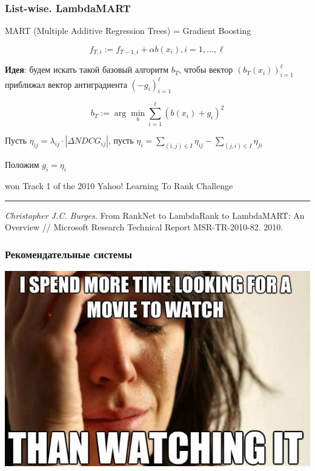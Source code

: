 \documentclass[fullscreen=true, bookmarks=true, hyperref={pdfencoding=unicode}]{beamer}
\begin{document}
\begin{frame}
  \frametitle{List-wise. LambdaMART}

  MART (Multiple Additive Regression Trees) = Gradient Boosting

  $$ f_{T, i} := f_{T-1, i} + \alpha b(x_i), i = 1, \dots, \ell $$

  {\bf Идея}: будем искать такой базовый алгоритм $b_T$, чтобы вектор $\left(b_T(x_i)\right)_{i=1}^\ell$ приближал вектор антиградиента $\left(-g_i\right)_{i=1}^\ell$

  $$ b_T := \arg\min\limits_b \sum\limits_{i=1}^\ell \left( b(x_i) + g_i \right)^2$$

  Пусть $\eta_{ij} = \lambda_{ij} \cdot |\Delta NDCG_{ij}|$, пусть $\eta_i = \sum\limits_{(i,j) \in I} \eta_{ij} - \sum\limits_{(j,i) \in I} \eta_{ji}$

  Положим $g_i = \eta_i$

  won Track 1 of the 2010 Yahoo! Learning To Rank Challenge

  \noindent\rule{8cm}{0.4pt}

  {\small
  {\it Christopher J.C. Burges.} From RankNet to LambdaRank to LambdaMART: An Overview // Microsoft Research Technical Report MSR-TR-2010-82. 2010.}
\end{frame}


\begin{frame}
  \frametitle{Рекомендательные системы}

  \begin{center}
    \includegraphics[keepaspectratio,
                   width=.9\paperwidth]{rec_sys_mem.jpeg}
  \end{center}
\end{frame}
\end{document}

